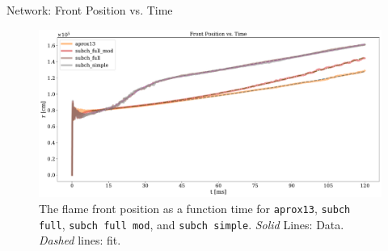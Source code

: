 \documentclass[
	11pt, %
]{beamer}
\begin{document}
\begin{frame}{Network: Front Position vs. Time}
    \begin{figure}
        \centering
        \includegraphics[width=1\linewidth]{network_front.pdf}
        \caption{The flame front position as a function time for {\tt aprox13}, {\tt subch full}, {\tt subch full mod}, and {\tt subch simple}. {\it Solid} Lines: Data. {\it Dashed} lines: fit.}
    \end{figure}
    
    
\end{frame}
\end{document}
